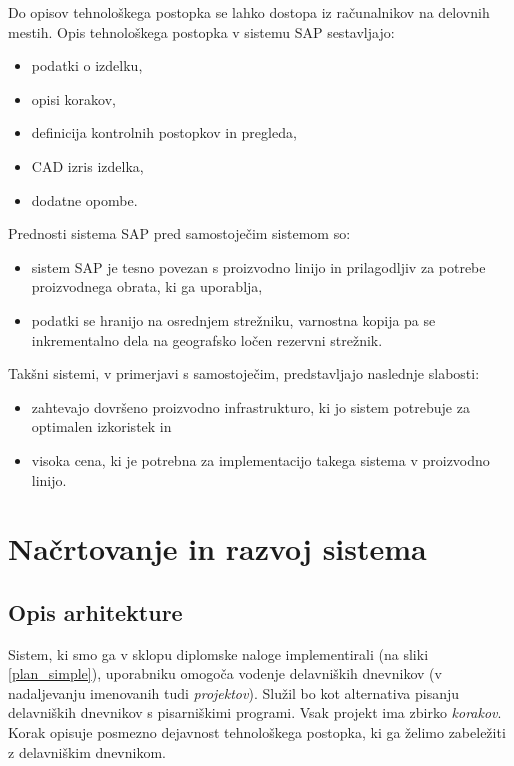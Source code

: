 \documentclass[a4paper, 12pt]{book}
\begin{document}
Do opisov tehnološkega postopka se lahko dostopa iz računalnikov na delovnih mestih.
Opis tehnološkega postopka v sistemu SAP sestavljajo:
\begin{itemize}
	\item podatki o izdelku,
	\item opisi korakov,
	\item definicija kontrolnih postopkov in pregleda, 
	\item CAD izris izdelka,
	\item dodatne opombe.
\end{itemize}

\noindent Prednosti sistema SAP pred samostoječim sistemom so:
\begin{itemize}
	\item sistem SAP je tesno povezan s proizvodno linijo in prilagodljiv za potrebe proizvodnega obrata, ki ga uporablja,
	\item podatki se hranijo na osrednjem strežniku, varnostna kopija pa se inkrementalno dela na geografsko ločen rezervni strežnik.
\end{itemize}

Takšni sistemi, v primerjavi s samostoječim, predstavljajo naslednje slabosti:
\begin{itemize}
	\item zahtevajo dovršeno proizvodno infrastrukturo, ki jo sistem potrebuje za optimalen izkoristek in
	\item visoka cena, ki je potrebna za implementacijo takega sistema v proizvodno linijo.
\end{itemize}




\chapter{Načrtovanje in razvoj sistema}



\section{Opis arhitekture} \label{architecture}

Sistem, ki smo ga v sklopu diplomske naloge implementirali (na sliki \ref{plan_simple}), uporabniku omogoča vodenje delavniških dnevnikov (v nadaljevanju imenovanih tudi \textit{projektov}).
Služil bo kot alternativa pisanju delavniških dnevnikov s pisarniškimi programi.
Vsak projekt ima zbirko \textit{korakov}.
Korak opisuje posmezno dejavnost tehnološkega postopka, ki ga želimo zabeležiti z delavniškim dnevnikom.
\end{document}
